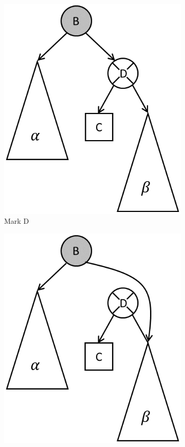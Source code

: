 \documentclass[letterpaper,twocolumn]{article}
\begin{document}
\begin{figure}[!bt]
\begin{subfigure}[b]{0.2\textwidth}
		\includegraphics[width=1\textwidth]{bst_del_3.png} 
		\caption{Mark D}
	\end{subfigure}
	\qquad
	\begin{subfigure}[b]{0.2\textwidth}\centering
		\includegraphics[width=1\textwidth]{bst_del_4.png} 

\end{subfigure}
\end{figure}
\end{document}
